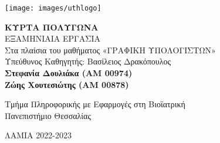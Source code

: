 \begin{titlepage}

\begin{center}

\texttt{[image: images/uthlogo]}\\
\vspace{3em}

\Large \textbf {ΚΥΡΤΑ ΠΟΛΥΓΩΝΑ}\\
\vspace{3em}
\normalsize ΕΞΑΜΗΝΙΑΙΑ ΕΡΓΑΣΙΑ \\
Στα πλαίσια του μαθήματος «ΓΡΑΦΙΚΗ ΥΠΟΛΟΓΙΣΤΩΝ»\\
\vspace{1.5em} Υπεύθυνος Καθηγητής: Βασίλειος Δρακόπουλος\\
\vspace{6em}
\textup{\small {\bf Στεφανία Δουλιάκα (AM 00974)}\\
\vspace{1.5em} {\bf Ζώης Χουτεσιώτης (AM 00878)}} 

\vspace{2in}
Τμήμα Πληροφορικής με Εφαρμογές στη Βιοϊατρική \\
Πανεπιστήμιο Θεσσαλίας
\vspace{1.5em}

\vfill
ΛΑΜΙΑ 2022-2023

\end{center}

\end{titlepage}